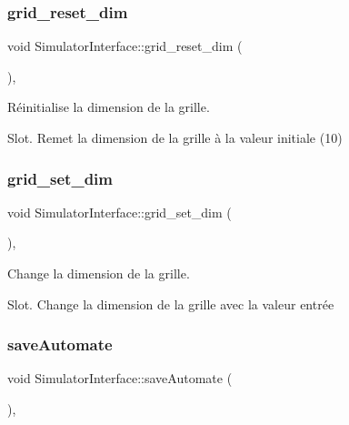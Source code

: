 \subsubsection{\texorpdfstring{grid\+\_\+reset\+\_\+dim}{grid\_reset\_dim}}
{\footnotesize\ttfamily void Simulator\+Interface\+::grid\+\_\+reset\+\_\+dim (\begin{DoxyParamCaption}{ }\end{DoxyParamCaption})\hspace{0.3cm}{\ttfamily [protected]}, {\ttfamily [slot]}}



Réinitialise la dimension de la grille. 

Slot. Remet la dimension de la grille à la valeur initiale (10) \mbox{\label{class_simulator_interface_a86a19994b8db3df11adabda5ed31fd82}} 
\subsubsection{\texorpdfstring{grid\+\_\+set\+\_\+dim}{grid\_set\_dim}}
{\footnotesize\ttfamily void Simulator\+Interface\+::grid\+\_\+set\+\_\+dim (\begin{DoxyParamCaption}{ }\end{DoxyParamCaption})\hspace{0.3cm}{\ttfamily [protected]}, {\ttfamily [slot]}}



Change la dimension de la grille. 

Slot. Change la dimension de la grille avec la valeur entrée \mbox{\label{class_simulator_interface_a723933742f1dfb0f0e87754c99230eb4}} 
\subsubsection{\texorpdfstring{save\+Automate}{saveAutomate}}
{\footnotesize\ttfamily void Simulator\+Interface\+::save\+Automate (\begin{DoxyParamCaption}{ }\end{DoxyParamCaption})\hspace{0.3cm}{\ttfamily [protected]}, {\ttfamily [slot]}}



